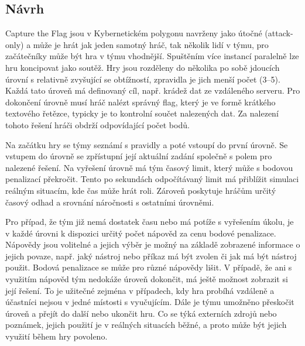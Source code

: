 \documentclass[
  digital, %
  oneside, %
  table,   %
  nolof,     %
  nolot,     %
]{fithesis3}
\begin{document}
\subsection{Návrh} \label{gameDesign}
Capture the Flag jsou v Kybernetickém polygonu navrženy jako útočné (attack-only) a může je hrát jak jeden samotný hráč, tak několik lidí v týmu, pro začátečníky může být hra v týmu vhodnější. Spuštěním více instancí paralelně lze hru koncipovat jako soutěž. Hry jsou rozděleny do několika po sobě jdoucích úrovní s relativně zvyšující se obtížností, zpravidla je jich menší počet (3–5). Každá tato úroveň má definovaný cíl, např. krádež dat ze vzdáleného serveru. Pro dokončení úrovně musí hráč nalézt správný flag, který je ve formě krátkého textového řetězce, typicky je to kontrolní součet nalezených dat. Za nalezení tohoto řešení hráči obdrží odpovídající počet bodů.\par
Na začátku hry se týmy seznámí s pravidly a poté vstoupí do první úrovně. Se vstupem do úrovně se zpřístupní její aktuální zadání společně s polem pro nalezené řešení. Na vyřešení úrovně má tým časový limit, který může s bodovou penalizací překročit. Tento po sekundách odpočítávaný limit má přiblížit simulaci reálným situacím, kde čas může hrát roli. Zároveň poskytuje hráčům určitý časový odhad a srovnání náročnosti s ostatními úrovněmi.\par
Pro případ, že tým již nemá dostatek času nebo má potíže s vyřešením úkolu, je v každé úrovni k dispozici určitý počet nápověd za cenu bodové penalizace. Nápovědy jsou volitelné a jejich výběr je možný na základě zobrazené informace o jejich povaze, např. jaký nástroj nebo příkaz má být zvolen či jak má být nástroj použit. Bodová penalizace se může pro různé nápovědy lišit. V případě, že ani s využitím nápověd tým nedokáže úroveň dokončit, má ještě možnost zobrazit si její řešení. To je užitečné zejména v případech, kdy hra probíhá vzdáleně a účastníci nejsou v jedné místosti s vyučujícím. Dále je týmu umožněno přeskočit úroveň a přejít do další nebo ukončit hru. Co se týká externích zdrojů nebo poznámek, jejich použití je v reálných situacích běžné, a proto může být jejich využití během hry povoleno. \cite{ctfDesign}\par
\end{document}
